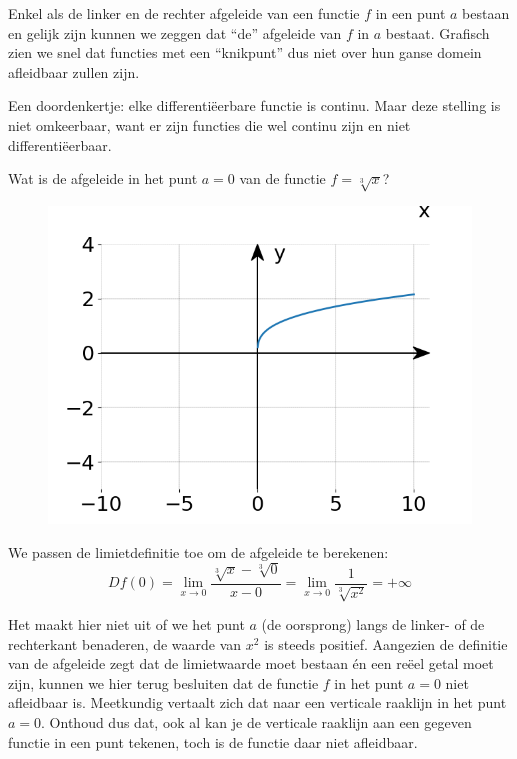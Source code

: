 \medskip{}


Enkel als de linker en de rechter afgeleide van een functie $f$ in
een punt $a$ bestaan en gelijk zijn kunnen we zeggen dat ``de''
afgeleide van $f$ in $a$ bestaat. Grafisch zien we snel dat functies
met een ``knikpunt'' dus niet over hun ganse domein afleidbaar zullen
zijn.\medskip{}


Een doordenkertje: elke differentiëerbare functie is continu. Maar
deze stelling is niet omkeerbaar, want er zijn functies die wel continu
zijn en niet differentiëerbaar.\medskip{}


\begin{voorbeeld}
	Wat is de afgeleide in het punt $a=0$ van de functie
$f=\sqrt[3]{x}$? 

	\begin{figure}[h]
	\begin{center}
		\includegraphics[height=5 cm]{6_afgeleiden_integralen/inputs/1_2_vb5}
	\end{center}
\end{figure}

We passen de limietdefinitie toe om de afgeleide
te berekenen:
\[
Df(0)={\displaystyle \lim_{x\to0}}\frac{\sqrt[3]{x}-\sqrt[3]{0}}{x-0}={\displaystyle \lim_{x\to0}}\frac{1}{\sqrt[3]{x^{2}}}=+\infty
\]

Het maakt hier niet uit of we het punt $a$ (de oorsprong) langs de
linker- of de rechterkant benaderen, de waarde van $x^{2}$ is steeds
positief. Aangezien de definitie van de afgeleide zegt dat de limietwaarde
moet bestaan én een reëel getal moet zijn, kunnen we hier terug besluiten
dat de functie $f$ in het punt $a=0$ niet afleidbaar is. Meetkundig
vertaalt zich dat naar een verticale raaklijn in het punt $a=0$.
Onthoud dus dat, ook al kan je de verticale raaklijn aan een gegeven
functie in een punt tekenen, toch is de functie daar niet afleidbaar.\medskip{}

\end{voorbeeld}



